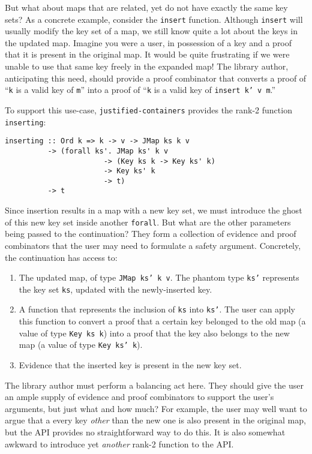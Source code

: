 \documentclass[format=sigplan, review=false, screen=true]{acmart}
\makeatletter
\let\origsubsection\subsection
\renewcommand\subsection{\@ifstar{\starsubsection}{\nostarsubsection}}
\newcommand\nostarsubsection[1]
{\subsectionprelude\origsubsection{#1}\subsectionpostlude}
\newcommand\starsubsection[1]
{\subsectionprelude\origsubsection*{#1}\subsectionpostlude}
\newcommand\subsectionprelude{%
  \vspace{-0.25em}
}
\newcommand\subsectionpostlude{%
  \vspace{-0.05em}
}
\makeatother
\begin{document}
\subsection{Changing the key set}\label{changing-keys}
But what about maps that are related, yet do not have exactly the same key sets?
As a concrete example, consider the \texttt{insert} function. Although \texttt{insert} will usually
modify the key set of a map, we still know quite a lot about the keys in the updated map.
 Imagine you were a user, in possession of a key and a proof
that it is present in the original map. It would be quite frustrating if  we were
unable to use that same key freely in the expanded map!
The library author, anticipating this need, should provide a proof combinator that
converts a proof of ``\texttt{k} is a valid key of \texttt{m}'' into a proof of
``\texttt{k} is a valid key of \texttt{insert k' v m}.''

To support this use-case, \texttt{justified-containers} provides the rank-2
function \texttt{inserting}:
\begin{verbatim}
inserting :: Ord k => k -> v -> JMap ks k v
          -> (forall ks'. JMap ks' k v
                       -> (Key ks k -> Key ks' k)
                       -> Key ks' k
                       -> t)
          -> t
\end{verbatim}
Since insertion results in a map with a new key set, we must
introduce the ghost of this new key set inside another \texttt{forall}.
But what are the other parameters being passed to the continuation?
They form a collection of evidence and proof combinators that the user may
need to formulate a safety argument. Concretely,  the continuation has access to:
\begin{enumerate}
\item The updated map, of type \texttt{JMap ks' k v}. The phantom type \texttt{ks'}
  represents the key set \texttt{ks}, updated with the newly-inserted key.
\item A function that represents the inclusion of \texttt{ks} into \texttt{ks'}.
  The user can apply this function to convert a proof that a certain key belonged to the
  old map (a value of type \texttt{Key ks k}) into a proof that the key also belongs to the new map (a value of type \texttt{Key ks' k}).
\item Evidence that the inserted key is present in the new key set.
\end{enumerate}

The library author must perform a balancing act here. They should give 
the user an ample supply of evidence and proof combinators to support the user's
arguments, but just what and how much? For example, the user may well want to argue that a
every key \emph{other} than the new one is also present in the original map,
 but the API provides no straightforward way to do this.
It is also somewhat awkward to introduce yet \emph{another}
rank-2 function to the API.
\end{document}
